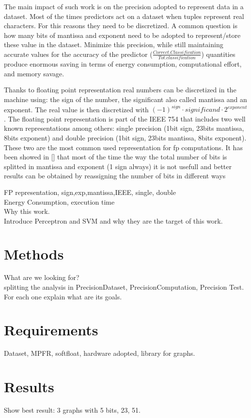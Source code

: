 \documentclass[sigplan,review,anonymous=false]{acmart}\settopmatter{printfolios=true,printccs=false,printacmref=false}
\begin{document}
The main impact of such work is on the precision adopted to represent data in a dataset. Most of the times predictors act on a dataset when tuples represent real characters. For this reasons they need to be discretized. A common question is how many bits of mantissa and exponent need to be adopted to represent/store these value in the dataset. Minimize this precision, while still maintaining accurate values for the accuracy of the predictor ($\frac{Correct.Classification}{Tot.classification}$) quantities produce enormous saving in terms of energy consumption, computational effort, and memory savage.

Thanks to floating point representation real numbers can be discretized in the machine using: the sign of the number, the significant also called mantissa and an exponent. The real value is then discretized with $(-1)^{sign} \cdot significand \cdot 2^{exponent}$. The floating point representation is part of the IEEE 754 that includes two well known representations among others: single precision (1bit sign, 23bits mantissa, 8bits exponent) and double precision (1bit sign, 23bits mantissa, 8bits exponent). These two are the most common used representation for fp computations. It has been showed in [] that most of the time the way the total number of bits is splitted in mantissa and exponent (1 sign always) it is not usefull and better results can be obtained by reassigning the number of bits in different ways\cite{softfloat}
 
FP representation, sign,exp,mantissa,IEEE, single, double\\
Energy Consumption, execution time\\
Why this work.\\
Introduce Perceptron and SVM and why they are the target of this work.

\section{Methods}
What are we looking for?\\
splitting the analysis in PrecisionDataset, PrecisionComputation, Precision Test.
For each one explain what are its goals. 
\section{Requirements}
Dataset, MPFR, softfloat, hardware adopted, library for graphs. 
\section{Results}
Show best result: 3 graphs with 5 bits, 23, 51.
\end{document}
